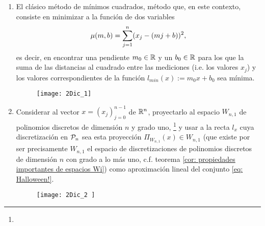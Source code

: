 \begin{enumerate}
\item El clásico método de
mínimos cuadrados, método que, en este contexto,
consiste en minimizar a la función
de dos variables 
\begin{equation}
\label{eq: funcion a minimizar}
\mu (m,b)= \sum\limits_{j=1}^{n}(x_{j}-(mj+b))^{2},
\end{equation}
es decir, en encontrar una pendiente
$m_{0} \in \mathbb{R}$ y un $b_{0} \in \mathbb{R}$ 
para los que la suma de las distancias
al cuadrado entre las mediciones 
(i.e. los valores $x_{j}$)
y los valores correspondientes de la función
$l_{min}(x):=m_{0}x+b_{0}$
sea mínima. 


\begin{figure}[H]
	\centering
	\texttt{[image: 2Dic\_1]} 
\end{figure}	


\item Considerar al vector $x=(x_{j})_{j=0}^{n-1}$
de $\mathbb{R}^{n}$, proyectarlo al espacio $W_{n,1}$ 
de polinomios discretos de dimensión $n$ y grado uno,
\footnote{}
y usar
a la recta $l_{x}$ cuya discretización en 
$\mathcal{P}_{n}$ sea esta proyección
$\Pi_{W_{n,1}}(x) \in W_{n,1}$ 
(que existe por ser precisamente
$W_{n,1}$ el espacio de discretizaciones
de polinomios discretos de dimensión $n$ con
grado a lo más uno, c.f. 
teorema \ref{cor: propiedades importantes de espacios Wi})
como aproximación lineal del conjunto \eqref{eq: Halloween!}.


\begin{figure}[H]
	\centering
	\texttt{[image: 2Dic\_2 ]} 
\end{figure}	

\end{enumerate}


